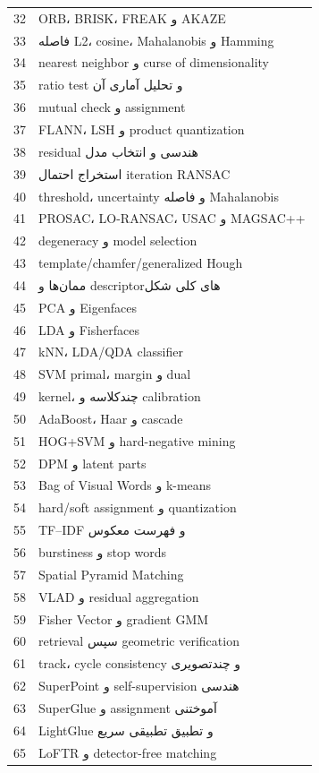 \documentclass[12pt,openany,oneside]{book}
\begin{document}
\begin{longtable}{p{12mm}p{116mm}}
32 & ORB، BRISK، FREAK و AKAZE \\
33 & فاصله L2، cosine، Mahalanobis و Hamming \\
34 & nearest neighbor و curse of dimensionality \\
35 & ratio test و تحلیل آماری آن \\
36 & mutual check و assignment \\
37 & FLANN، LSH و product quantization \\
38 & residual هندسی و انتخاب مدل \\
39 & استخراج احتمال iteration RANSAC \\
40 & threshold، uncertainty و فاصله Mahalanobis \\
41 & PROSAC، LO-RANSAC، USAC و MAGSAC++ \\
42 & degeneracy و model selection \\
43 & template/chamfer/generalized Hough \\
44 & ممان‌ها و descriptorهای کلی شکل \\
45 & PCA و Eigenfaces \\
46 & LDA و Fisherfaces \\
47 & kNN، LDA/QDA classifier \\
48 & SVM primal، margin و dual \\
49 & kernel، چندکلاسه و calibration \\
50 & AdaBoost، Haar و cascade \\
51 & HOG+SVM و hard-negative mining \\
52 & DPM و latent parts \\
53 & Bag of Visual Words و k-means \\
54 & hard/soft assignment و quantization \\
55 & TF--IDF و فهرست معکوس \\
56 & burstiness و stop words \\
57 & Spatial Pyramid Matching \\
58 & VLAD و residual aggregation \\
59 & Fisher Vector و gradient GMM \\
60 & retrieval سپس geometric verification \\
61 & track، cycle consistency و چندتصویری \\
62 & SuperPoint و self-supervision هندسی \\
63 & SuperGlue و assignment آموختنی \\
64 & LightGlue و تطبیق تطبیقی سریع \\
65 & LoFTR و detector-free matching \\

\end{longtable}
\end{document}
